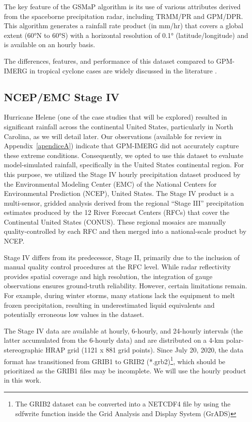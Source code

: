 The key feature of the GSMaP algorithm is its use of various attributes derived from the spaceborne precipitation radar, including TRMM/PR and GPM/DPR. This algorithm generates a rainfall rate product (in mm/hr) that covers a global extent (60°N to 60°S) with a horizontal resolution of 0.1° (latitude/longitude) and is available on an hourly basis.

The differences, features, and performance of this dataset compared to GPM-IMERG in tropical cyclone cases are widely discussed in the literature \cite{reddy2022accurately, bagtasa2022assessment, yang2024evaluation}.

\subsection{NCEP/EMC Stage IV}
\label{section316}

Hurricane Helene (one of the case studies that will be explored) resulted in significant rainfall across the continental United States, particularly in North Carolina, as we will detail later. Our observations (available for review in Appendix~\ref{apendiceA}) indicate that GPM-IMERG did not accurately capture these extreme conditions. Consequently, we opted to use this dataset to evaluate model-simulated rainfall, specifically in the United States continental region. For this purpose, we utilized the Stage IV hourly precipitation dataset produced by the Environmental Modeling Center (EMC) of the National Centers for Environmental Prediction (NCEP), United States. The Stage IV product is a multi-sensor, gridded analysis derived from the regional “Stage III” precipitation estimates produced by the 12 River Forecast Centers (RFCs) that cover the Continental United States (CONUS). These regional mosaics are manually quality-controlled by each RFC and then merged into a national-scale product by NCEP.

Stage IV differs from its predecessor, Stage II, primarily due to the inclusion of manual quality control procedures at the RFC level. While radar reflectivity provides spatial coverage and high resolution, the integration of gauge observations ensures ground-truth reliability. However, certain limitations remain. For example, during winter storms, many stations lack the equipment to melt frozen precipitation, resulting in underestimated liquid equivalents and potentially erroneous low values in the dataset.

The Stage IV data are available at hourly, 6-hourly, and 24-hourly intervals (the latter accumulated from the 6-hourly data) and are distributed on a 4-km polar-stereographic HRAP grid (1121 x 881 grid points). Since July 20, 2020, the data format has transitioned from GRIB1 to GRIB2 (*.grb2)\footnote{The GRIB2 dataset can be converted into a NETCDF4 file by using the sdfwrite function inside the Grid Analysis and Display System (GrADS)}, which should be prioritized as the GRIB1 files may be incomplete. We will use the hourly product in this work.

